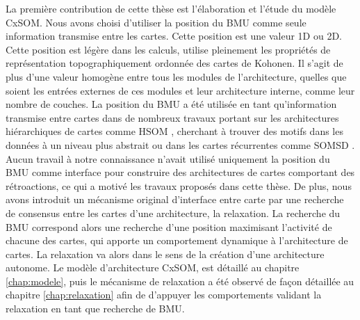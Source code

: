 La première contribution de cette thèse est l'élaboration et l'étude du modèle CxSOM.
Nous avons choisi d'utiliser la position du BMU comme seule information transmise entre les cartes. Cette position est une valeur 1D ou 2D. Cette position est légère dans les calculs, utilise pleinement les propriétés de représentation topographiquement ordonnée des cartes de Kohonen. Il s'agit de plus d'une valeur homogène entre tous les modules de l'architecture, quelles que soient les entrées externes de ces modules et leur architecture interne, comme leur nombre de couches.
La position du BMU a été utilisée en tant qu'information transmise entre cartes dans de nombreux travaux portant sur les architectures hiérarchiques de cartes comme HSOM \parencite{lampinen_clustering_1992}, cherchant à trouver des motifs dans les données à un niveau plus abstrait ou dans les cartes récurrentes comme SOMSD \parencite{hagenbuchner_self-organizing_2003}.
Aucun travail à notre connaissance n'avait utilisé uniquement la position du BMU comme interface pour construire des architectures de cartes comportant des rétroactions, ce qui a motivé les travaux proposés dans cette thèse.
De plus, nous avons introduit un mécanisme original d'interface entre carte par une recherche de consensus entre les cartes d'une architecture, la relaxation.
La recherche du BMU correspond alors une recherche d'une position maximisant l'activité de chacune des cartes, qui apporte un comportement dynamique à l'architecture de cartes. 
La relaxation va alors dans le sens de la création d'une architecture autonome.
Le modèle d'architecture CxSOM, est détaillé au chapitre \ref{chap:modele}, puis le mécanisme de relaxation a été observé de façon détaillée au chapitre \ref{chap:relaxation} afin de d'appuyer les comportements validant la relaxation en tant que recherche de BMU. 

